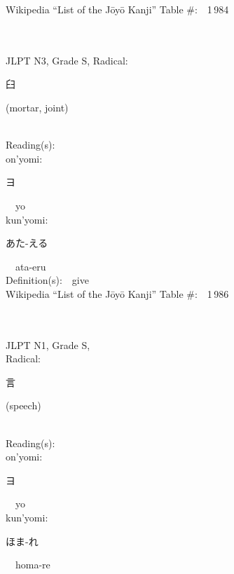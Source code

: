 \begin{multicols}{2}
Wikipedia ``List of the J\=oy\=o Kanji'' Table \#:\ \ 1\,984 \\
\ \ \\
{\fontsize{34pt}{40pt}  }\ \ \\  %
{JLPT N3, Grade S, Radical:\ \ {\begin{CJK}{UTF8}{min} 臼 \end{CJK}} (mortar, joint) } \\
Reading(s):\ \ \\
{\hspace*{1em}}on'yomi:\ \ \\
{\hspace*{2em}}{\begin{CJK}{UTF8}{min} ヨ \end{CJK}}\ \ yo\ \ \\
{\hspace*{1em}}kun'yomi:\ \ \\
{\hspace*{2em}}{\begin{CJK}{UTF8}{min} あた-える \end{CJK}}\ \ ata-eru\ \ \\
Definition(s):\ \ give \\
Wikipedia ``List of the J\=oy\=o Kanji'' Table \#:\ \ 1\,986 \\
\ \ \\
{\fontsize{34pt}{40pt}  }\ \ \\
{JLPT N1, Grade S, \\Radical:\ \ {\begin{CJK}{UTF8}{min} 言 \end{CJK}} (speech) } \\
Reading(s):\ \ \\
{\hspace*{1em}}on'yomi:\ \ \\
{\hspace*{2em}}{\begin{CJK}{UTF8}{min} ヨ \end{CJK}}\ \ yo\ \ \\
{\hspace*{1em}}kun'yomi:\ \ \\
{\hspace*{2em}}{\begin{CJK}{UTF8}{min} ほま-れ \end{CJK}}\ \ homa-re\ \ \\

\end{multicols}
